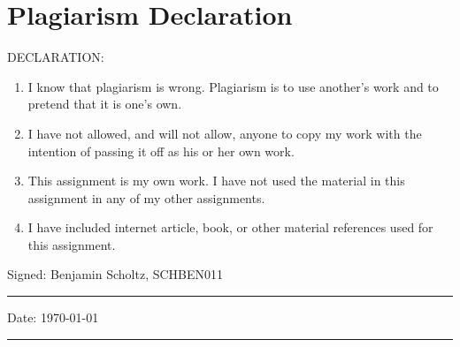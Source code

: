 
\newpage
\section{Plagiarism Declaration}
DECLARATION:
\begin{enumerate}
\item I know that plagiarism is wrong. Plagiarism is to use another's work and to pretend that it is one's own.
\item I have not allowed, and will not allow, anyone to copy my work with the intention of passing it off as his or her own work.
\item This assignment is my own work. I have not used the material in this assignment in any of my other assignments.
\item I have included internet article, book, or other material references used for this assignment.
\end{enumerate}

Signed: Benjamin Scholtz, SCHBEN011\\
\hrule
Date: \today \\
\hrule